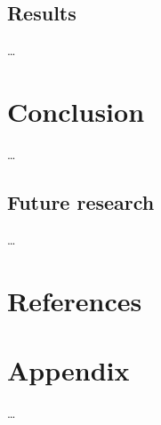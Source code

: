 \documentclass{article}
\begin{document}
\subsection{Results}\label{sec:results}
\ldots

\section{Conclusion}\label{sec:conclusion}
\ldots

\subsection{Future research}\label{sec:future-research}
\ldots

\section*{References}\label{sec:references}
\printbibliography[heading=none]

\section*{Appendix}
\ldots
\end{document}
